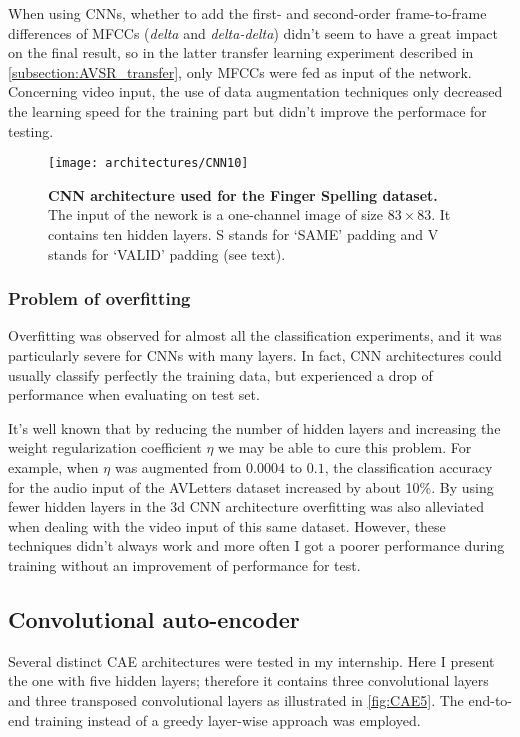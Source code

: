 When using CNNs, whether to add the first- and second-order frame-to-frame
differences of MFCCs (\textit{delta} and \textit{delta-delta}) didn't seem
to have a great impact on the final result, so in the latter transfer
learning experiment described in \ref{subsection:AVSR_transfer}, only
MFCCs were fed as input of the network.
Concerning video input, the use of data augmentation techniques only
decreased the learning speed for the training part but didn't improve
the performace for testing.

\begin{figure}[H]
  \centering
  \texttt{[image: architectures/CNN10]}
  \caption{%
    \textbf{CNN architecture used for the Finger Spelling  dataset.}
      \\[0.1em]
    The input of the nework is a one-channel image of size $83 \times 83$.
      It contains ten hidden layers. S stands for `SAME' padding
      and V stands for `VALID' padding (see text).}
  \label{fig:CNN10}
\end{figure}

\subsubsection{Problem of overfitting}

Overfitting was observed for almost all the classification
experiments, and it was particularly severe for
CNNs with many layers.
In fact, CNN architectures could usually classify
perfectly the training data, but experienced a drop of performance
when evaluating on test set.

It's well known that by reducing the number of hidden layers and
increasing the weight regularization coefficient $\eta$ we may
be able to cure this problem.
For example, when $\eta$ was augmented from $0.0004$ to $0.1$,
the classification accuracy for the audio input of the AVLetters
dataset increased by about 10\%.
By using fewer hidden layers in the 3d CNN architecture overfitting
was also alleviated when dealing with the video input of this same dataset.
However, these techniques didn't always work
and more often I got a poorer performance during training without
an improvement of performance for test.

\subsection{Convolutional auto-encoder} \label{subsection:CAE}

Several distinct CAE architectures were tested in my internship.
Here I present the one with five hidden layers; therefore it contains
three convolutional layers and three transposed convolutional layers
as illustrated in \autoref{fig:CAE5}. The end-to-end training instead of
a greedy layer-wise approach was employed.

